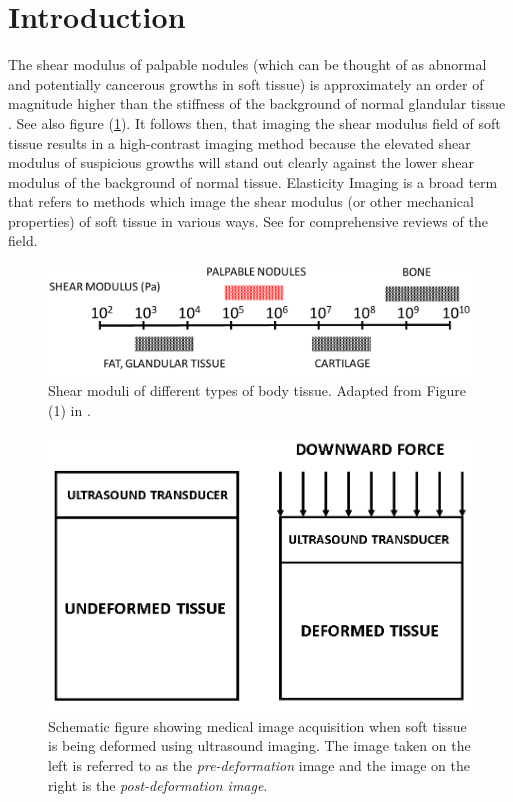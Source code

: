 \documentclass[10pt]{article}
\begin{document}
\section{Introduction}
The shear modulus of palpable nodules (which can be thought of as abnormal and potentially cancerous growths in soft tissue) is approximately an order of magnitude higher than the stiffness of the background of normal glandular tissue \cite{paper:sarv1998}. See also figure (\ref{fig:shearmod}). It follows then, that imaging the shear modulus field of soft tissue results in a high-contrast imaging method because the elevated shear modulus of suspicious growths will stand out clearly against the lower shear modulus of the background of normal tissue. Elasticity Imaging is a broad term that refers to methods which image the shear modulus (or other mechanical properties) of soft tissue in various ways. See \cite{paper:gao1996,paper:parker2010,book:alamgarra2019,bookchap:oberaibarbone2019} for comprehensive reviews of the field.
%
\begin{figure}[!h]
   \centering
    \includegraphics[totalheight=3cm]{Figures/shearmod_new.png}
  \caption{\label{fig:shearmod} Shear moduli of different types of body tissue. Adapted from Figure (1) in \cite{paper:sarv1998}.}
\end{figure}
%
\begin{figure}[!h]
   \centering
    \includegraphics[totalheight=5cm]{Figures/prepostnew.png}
  \caption{\label{fig:prepostimage} Schematic figure showing medical image acquisition when soft tissue is being deformed using ultrasound imaging. The image taken on the left is referred to as the \textit{pre-deformation} image and the image on the right is the \textit{post-deformation image}.}
\end{figure}
%
\end{document}
